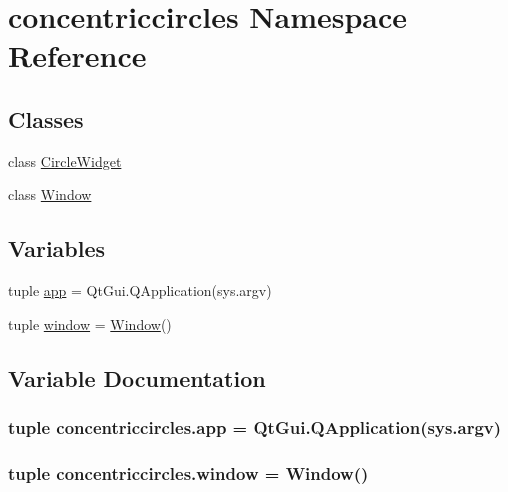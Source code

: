 \hypertarget{namespaceconcentriccircles}{}\section{concentriccircles Namespace Reference}
\label{namespaceconcentriccircles}
\subsection*{Classes}
\begin{DoxyCompactItemize}
\item 
class \hyperlink{classconcentriccircles_1_1CircleWidget}{Circle\+Widget}
\item 
class \hyperlink{classconcentriccircles_1_1Window}{Window}
\end{DoxyCompactItemize}
\subsection*{Variables}
\begin{DoxyCompactItemize}
\item 
tuple \hyperlink{namespaceconcentriccircles_ac47071d47f1d3f5f40a0b3a721a077b2}{app} = Qt\+Gui.\+Q\+Application(sys.\+argv)
\item 
tuple \hyperlink{namespaceconcentriccircles_ab9f22aa8d0bdc91dc75f20cc2be1f7a8}{window} = \hyperlink{classconcentriccircles_1_1Window}{Window}()
\end{DoxyCompactItemize}


\subsection{Variable Documentation}
\hypertarget{namespaceconcentriccircles_ac47071d47f1d3f5f40a0b3a721a077b2}{}
\subsubsection[{app}]{\setlength{\rightskip}{0pt plus 5cm}tuple concentriccircles.\+app = Qt\+Gui.\+Q\+Application(sys.\+argv)}\label{namespaceconcentriccircles_ac47071d47f1d3f5f40a0b3a721a077b2}
\hypertarget{namespaceconcentriccircles_ab9f22aa8d0bdc91dc75f20cc2be1f7a8}{}
\subsubsection[{window}]{\setlength{\rightskip}{0pt plus 5cm}tuple concentriccircles.\+window = {\bf Window}()}\label{namespaceconcentriccircles_ab9f22aa8d0bdc91dc75f20cc2be1f7a8}
